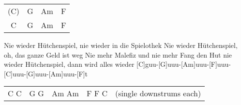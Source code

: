 \begin{guitar}
	{\footnotesize\begin{tabular}{c|c|c|c}
			(C) & G & Am & F\\
			C & G & Am & F
	\end{tabular}}

	Nie wieder Hütchenspiel, nie wieder in die Spielothek
	Nie wieder Hütchenspiel, oh, das ganze Geld ist weg
	Nie mehr Malefiz und nie mehr Fang den Hut
	nie wieder Hütchenspiel, dann wird alles wieder
	[C]guu-[G]uuu-[Am]uuu-[F]uuu-[C]uuu-[G]uuu-[Am]uuu-[F]t
	
	{\footnotesize\begin{tabular}{l|l|l|l l}
			C C & G G & Am Am & F F C & (single downstrums each)
	\end{tabular}}
\end{guitar}